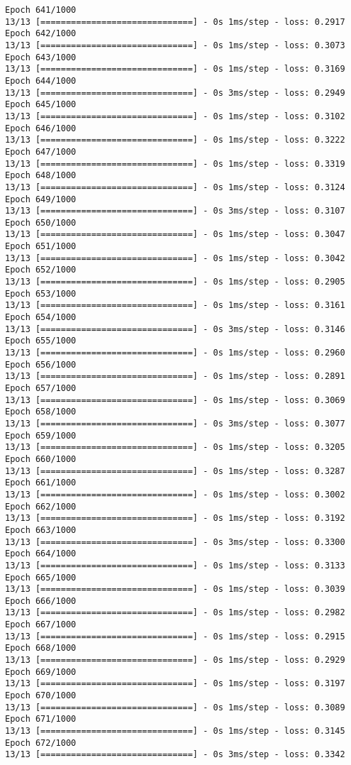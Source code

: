 \documentclass[11pt]{article}
\begin{document}
\begin{Verbatim}[commandchars=\\\{\}]
Epoch 641/1000
13/13 [==============================] - 0s 1ms/step - loss: 0.2917
Epoch 642/1000
13/13 [==============================] - 0s 1ms/step - loss: 0.3073
Epoch 643/1000
13/13 [==============================] - 0s 1ms/step - loss: 0.3169
Epoch 644/1000
13/13 [==============================] - 0s 3ms/step - loss: 0.2949
Epoch 645/1000
13/13 [==============================] - 0s 1ms/step - loss: 0.3102
Epoch 646/1000
13/13 [==============================] - 0s 1ms/step - loss: 0.3222
Epoch 647/1000
13/13 [==============================] - 0s 1ms/step - loss: 0.3319
Epoch 648/1000
13/13 [==============================] - 0s 1ms/step - loss: 0.3124
Epoch 649/1000
13/13 [==============================] - 0s 3ms/step - loss: 0.3107
Epoch 650/1000
13/13 [==============================] - 0s 1ms/step - loss: 0.3047
Epoch 651/1000
13/13 [==============================] - 0s 1ms/step - loss: 0.3042
Epoch 652/1000
13/13 [==============================] - 0s 1ms/step - loss: 0.2905
Epoch 653/1000
13/13 [==============================] - 0s 1ms/step - loss: 0.3161
Epoch 654/1000
13/13 [==============================] - 0s 3ms/step - loss: 0.3146
Epoch 655/1000
13/13 [==============================] - 0s 1ms/step - loss: 0.2960
Epoch 656/1000
13/13 [==============================] - 0s 1ms/step - loss: 0.2891
Epoch 657/1000
13/13 [==============================] - 0s 1ms/step - loss: 0.3069
Epoch 658/1000
13/13 [==============================] - 0s 3ms/step - loss: 0.3077
Epoch 659/1000
13/13 [==============================] - 0s 1ms/step - loss: 0.3205
Epoch 660/1000
13/13 [==============================] - 0s 1ms/step - loss: 0.3287
Epoch 661/1000
13/13 [==============================] - 0s 1ms/step - loss: 0.3002
Epoch 662/1000
13/13 [==============================] - 0s 1ms/step - loss: 0.3192
Epoch 663/1000
13/13 [==============================] - 0s 3ms/step - loss: 0.3300
Epoch 664/1000
13/13 [==============================] - 0s 1ms/step - loss: 0.3133
Epoch 665/1000
13/13 [==============================] - 0s 1ms/step - loss: 0.3039
Epoch 666/1000
13/13 [==============================] - 0s 1ms/step - loss: 0.2982
Epoch 667/1000
13/13 [==============================] - 0s 1ms/step - loss: 0.2915
Epoch 668/1000
13/13 [==============================] - 0s 1ms/step - loss: 0.2929
Epoch 669/1000
13/13 [==============================] - 0s 1ms/step - loss: 0.3197
Epoch 670/1000
13/13 [==============================] - 0s 1ms/step - loss: 0.3089
Epoch 671/1000
13/13 [==============================] - 0s 1ms/step - loss: 0.3145
Epoch 672/1000
13/13 [==============================] - 0s 3ms/step - loss: 0.3342

\end{Verbatim}
\end{document}
